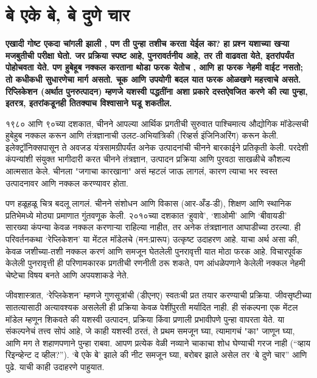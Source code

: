 \chapter{बे एके बे, बे दुणे चार }

\textcolor{blue!60!black}{\textbf{एखादी गोष्ट एकदा चांगली झाली , पण ती पुन्हा तशीच करता येईल का? हा प्रश्न यशाच्या खऱ्या मजबुतीची परीक्षा घेतो. जर प्रक्रिया स्पष्ट आहे, पुनरावर्तनीय आहे, तर ती वाढवता येते, इतरांपर्यंत पोहोचवता येते. पण हुबेहूब नक्कल करताना थोडा फरक येतोच , आणि हा फरक नेहमी वाईट नसतो; तो कधीकधी सुधारणेचा मार्ग असतो. चूक आणि उपयोगी बदल यात फरक ओळखणे महत्त्वाचे असते. रिप्लिकेशन (अर्थात पुनरुत्पादन) म्हणजे यशस्वी पद्धतींना अशा प्रकारे दस्तऐवजित करणे की त्या पुन्हा, इतरत्र, इतरांकडूनही तितक्याच विश्वासाने घडू शकतील.}}

१९८० आणि ९०च्या दशकात, चीनने आपल्या आर्थिक प्रगतीची सुरुवात पाश्चिमात्य औद्योगिक मॉडेल्सची हुबेहुब नक्कल करून आणि तंत्रज्ञानाची उलट-अभियांत्रिकी (रिव्हर्स इंजिनिअरिंग) करून केली. इलेक्ट्रॉनिक्सपासून ते अवजड यंत्रसामग्रीपर्यंत अनेक उत्पादनांची चीनने बारकाईने प्रतिकृती केली. परदेशी कंपन्यांशी संयुक्त भागीदारी करत चीनने तंत्रज्ञान, उत्पादन प्रक्रिया आणि पुरवठा साखळीचे कौशल्य आत्मसात केले. चीनला "जगाचा कारखाना" असं म्हटलं जाऊ लागलं, कारण त्याचा भर स्वस्त उत्पादनावर आणि नक्कल करण्यावर होता.

पण हळूहळू चित्र बदलू लागलं. चीनने संशोधन आणि विकास (आर-अँड-डी), शिक्षण आणि स्थानिक प्रतिभेमध्ये मोठ्या प्रमाणात गुंतवणूक केली. २०१०च्या दशकात ‘हुवावे’, ‘शाओमी’ आणि ‘बीवायडी’ सारख्या कंपन्या केवळ नक्कल करणाऱ्या राहिल्या नाहीत, तर अनेक तंत्रज्ञानात आघाडीच्या ठरल्या. ही परिवर्तनकथा ‘रेप्लिकेशन’ या मेंटल मॉडेलचे (मन:प्रारूप) उत्कृष्ट उदाहरण आहे. याचा अर्थ असा की, केवळ जशीच्या-तशी नक्कल करणं आणि समजून घेतलेली पुनरावृत्ती यात मोठा फरक आहे. विचारपूर्वक केलेली पुनरावृत्ती ही परिणामकारक प्रगतीची रणनीती ठरू शकते, पण आंधळेपणाने केलेली नक्कल नेहमी चेष्टेचा विषय बनते आणि अपयशाकडे नेते.

जीवशास्त्रात, ‘रेप्लिकेशन’ म्हणजे गुणसूत्रांची (डीएनए) स्वतःची प्रत तयार करण्याची प्रक्रिया. जीवसृष्टीच्या सातत्यासाठी अत्यावश्यक असलेली ही प्रक्रिया केवळ पेशींपुरती मर्यादित नाही. ही संकल्पना एक मेंटल मॉडेल म्हणून शिकवते की यशस्वी उत्पादन, प्रक्रिया किंवा प्रणाली प्रभावीपणे पुन्हा वापरता येते. या संकल्पनेचं तत्त्व सोपं आहे, जे काही यशस्वी ठरतं, ते प्रथम समजून घ्या, त्यामागचं "का" जाणून घ्या, आणि मग ते शहाणपणाने पुन्हा राबवा. आपण प्रत्येक वेळी नव्याने चाकाचा शोध घेण्याची गरज नाही (“व्हाय रिइन्व्हेन्ट द व्हील?”). ‘बे एके बे’ झाले की नीट समजून घ्या, बरोबर झाले असेल तर ‘बे दुणे चार” आणि पुढे. याची काही उदाहरणे पाहुयात.

